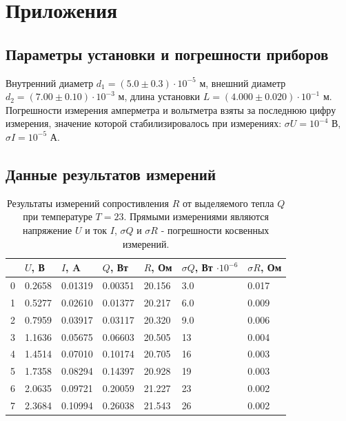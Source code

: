 \documentclass[12pt]{article}
\begin{document}
\section{Приложения}
\subsection{Параметры установки и погрешности приборов} \label{app_1}
Внутренний диаметр \(d_1 = (5.0 \pm 0.3) \cdot 10 ^ {-5}\) м, внешний диаметр \(d_2 = (7.00 \pm 0.10) \cdot 10 ^ {-3}\) м, длина установки \(L = (4.000 \pm 0.020) \cdot 10 ^ {-1}\) м. 
Погрешности измерения амперметра и вольтметра взяты за последнюю цифру измерения, значение которой 
стабилизировалось при измерениях: \(\sigma  U = 10^{-4}\) В, \(\sigma I = 10^{-5}\) А.
\subsection{Данные результатов измерений} \label{app_2}
\begin{table}[H]
    \centering
    \begin{tabular}{|l|l|l|l|l|l|l|}
        \hline
          & $U$, В & $I$, A  & $Q$, Вт & $R$, Ом & $\sigma Q$, Вт $\cdot 10^{-6}$ & $\sigma R$, Ом \\
        \hline
        0 & 0.2658 & 0.01319 & 0.00351 & 20.156  & 3.0                            & 0.017          \\
        1 & 0.5277 & 0.02610 & 0.01377 & 20.217  & 6.0                            & 0.009          \\
        2 & 0.7959 & 0.03917 & 0.03117 & 20.320  & 9.0                            & 0.006          \\
        3 & 1.1636 & 0.05675 & 0.06603 & 20.505  & 13                             & 0.004          \\
        4 & 1.4514 & 0.07010 & 0.10174 & 20.705  & 16                             & 0.003          \\
        5 & 1.7358 & 0.08294 & 0.14397 & 20.928  & 19                             & 0.003          \\
        6 & 2.0635 & 0.09721 & 0.20059 & 21.227  & 23                             & 0.002          \\
        7 & 2.3684 & 0.10994 & 0.26038 & 21.543  & 26                             & 0.002          \\
        \hline
    \end{tabular}
    
    \caption{Результаты измерений сопростивления \(R\) от выделяемого тепла \(Q\) при температуре \(T = 23\)\textcelsius.
        Прямыми измерениями являются напряжение \(U\) и ток \(I\), \(\sigma Q\) и \(\sigma R\) - погрешности косвенных измерений.}
    \label{tab:1}
\end{table}
\end{document}
